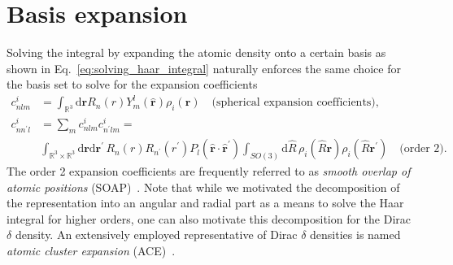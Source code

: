 

\section{Basis expansion}
Solving the integral by expanding the atomic density onto a certain basis as shown in Eq.~\eqref{eq:solving_haar_integral} naturally enforces the same choice for the basis set to solve for the expansion coefficients
\begin{subequations}
\label{eq:acdc_expansion}
\begin{align}
    \label{eq:gaussian_expansion}
    c^i_{nlm} &= \int_{\mathbb{R}^3}\mathrm{d}\mathbf{r} R_n(r)Y_m^l(\hat{\mathbf{r}})\rho_i(\mathbf{r})\quad\textrm{(spherical expansion coefficients),}\\
    c^i_{nn^\prime l} &= \sum_m c^i_{nlm}c^i_{n^\prime lm} = \nonumber \\
    \label{eq:soap_expansion}
                         &\int_{\mathbb{R}^3\times\mathbb{R}^3}\mathrm{d}\mathbf{r}\mathrm{d}\mathbf{r}^\prime\, R_n(r)R_{n^\prime}(r^\prime)P_l(\hat{\mathbf{r}}\cdot\hat{\mathbf{r}}^\prime) \int_{SO(3)}\mathrm{d}\hat{R}\,\rho_i(\hat{R}\mathbf{r})\rho_i(\hat{R}\mathbf{r}^\prime)\quad\textrm{(order 2)}.
\end{align}
\end{subequations}
The order 2 expansion coefficients are frequently referred to as \emph{smooth overlap of atomic positions} (SOAP)~\cite{bartok2013representing}.
Note that while we motivated the decomposition of the representation into an angular and radial part as a means to solve the Haar integral for higher orders, one can also motivate this decomposition for the Dirac $\delta$ density.
An extensively employed representative of Dirac $\delta$ densities is named \emph{atomic cluster expansion} (ACE)~\cite{drautz2019atomic}.

